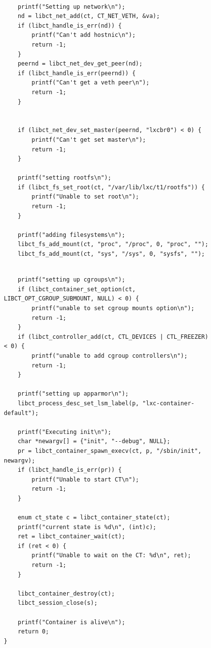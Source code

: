 \documentclass{beamer}
\begin{document}
\begin{frame}[fragile]
\begin{figure}
{\tiny
  \begin{lstlisting}

	printf("Setting up network\n");
	nd = libct_net_add(ct, CT_NET_VETH, &va);
	if (libct_handle_is_err(nd)) {
		printf("Can't add hostnic\n");
		return -1;
	}
	peernd = libct_net_dev_get_peer(nd);
	if (libct_handle_is_err(peernd)) {
		printf("Can't get a veth peer\n");
		return -1;
	}


	if (libct_net_dev_set_master(peernd, "lxcbr0") < 0) {
		printf("Can't get set master\n");
		return -1;
	}

	printf("setting rootfs\n");
	if (libct_fs_set_root(ct, "/var/lib/lxc/t1/rootfs")) {
		printf("Unable to set root\n");
		return -1;
	}

	printf("adding filesystems\n");
	libct_fs_add_mount(ct, "proc", "/proc", 0, "proc", "");
	libct_fs_add_mount(ct, "sys", "/sys", 0, "sysfs", "");
  \end{lstlisting}
}
\end{figure}
\end{frame}

\begin{frame}[fragile]
\begin{figure}
{\tiny
  \begin{lstlisting}

	printf("setting up cgroups\n");
	if (libct_container_set_option(ct, LIBCT_OPT_CGROUP_SUBMOUNT, NULL) < 0) {
		printf("unable to set cgroup mounts option\n");
		return -1;
	}
	if (libct_controller_add(ct, CTL_DEVICES | CTL_FREEZER) < 0) {
		printf("unable to add cgroup controllers\n");
		return -1;
	}

	printf("setting up apparmor\n");
	libct_process_desc_set_lsm_label(p, "lxc-container-default");

	printf("Executing init\n");
	char *newargv[] = {"init", "--debug", NULL};
	pr = libct_container_spawn_execv(ct, p, "/sbin/init", newargv);
	if (libct_handle_is_err(pr)) {
		printf("Unable to start CT\n");
		return -1;
	}

	enum ct_state c = libct_container_state(ct);
	printf("current state is %d\n", (int)c);
	ret = libct_container_wait(ct);
	if (ret < 0) {
		printf("Unable to wait on the CT: %d\n", ret);
		return -1;
	}

	libct_container_destroy(ct);
	libct_session_close(s);

	printf("Container is alive\n");
	return 0;
}

  \end{lstlisting}
}
\end{figure}
\end{frame}
\end{document}
